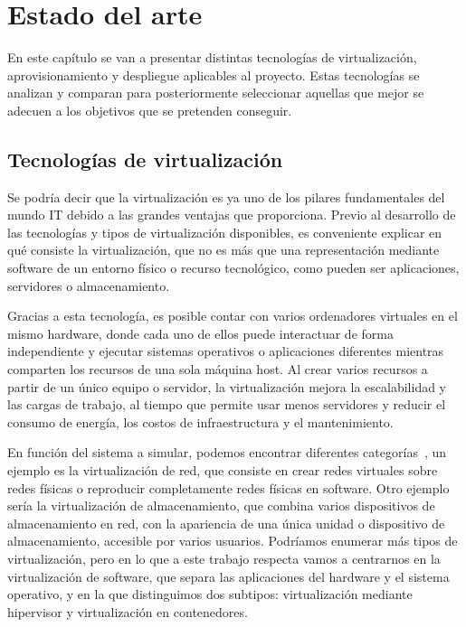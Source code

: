 \chapter{Estado del arte} \label{ch:estado}
    En este capítulo se van a presentar distintas tecnologías de virtualización, aprovisionamiento y despliegue aplicables al proyecto. Estas tecnologías se analizan y comparan para posteriormente seleccionar aquellas que mejor se adecuen a los objetivos que se pretenden conseguir.

\section{Tecnologías de virtualización} \label{sec:virt}
	Se podría decir que la virtualización es ya uno de los pilares fundamentales del mundo IT debido a las grandes ventajas que proporciona. Previo al desarrollo de las tecnologías y tipos de virtualización disponibles, es conveniente explicar en qué consiste la virtualización, que no es más que una representación mediante software de un entorno físico o recurso tecnológico, como pueden ser aplicaciones, servidores o almacenamiento.~\cite{virt1} 

	Gracias a esta tecnología, es posible contar con varios ordenadores virtuales en el mismo hardware, donde cada uno de ellos puede interactuar de forma independiente y ejecutar sistemas operativos o aplicaciones diferentes mientras comparten los recursos de una sola máquina host. Al crear varios recursos a partir de un único equipo o servidor, la virtualización mejora la escalabilidad y las cargas de trabajo, al tiempo que permite usar menos servidores y reducir el consumo de energía, los costos de infraestructura y el mantenimiento.

	En función del sistema a simular, podemos encontrar diferentes categorías~\cite{virt2}, un ejemplo es la virtualización de red, que consiste en crear redes virtuales sobre redes físicas o reproducir completamente redes físicas en software. Otro ejemplo sería la virtualización de almacenamiento, que combina varios dispositivos de almacenamiento en red, con la apariencia de una única unidad o dispositivo de almacenamiento, accesible por varios usuarios. Podríamos enumerar más tipos de virtualización, pero en lo que a este trabajo respecta vamos a centrarnos en la virtualización de software, que separa las aplicaciones del hardware y el sistema operativo, y en la que distinguimos dos subtipos: virtualización mediante hipervisor y virtualización en contenedores.

